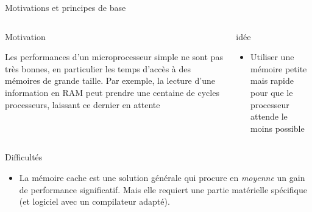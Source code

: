 
% 
\begin{Frame}{Motivations et principes de base}
  \begin{columns}[t]
    \begin{column}{\BW} %
      \begin{block}{Motivation}

 Les performances d'un microprocesseur simple ne sont pas
          très bonnes, en particulier les temps d'accès à des mémoires
          de grande taille. Par exemple, la lecture d'une information
          en RAM peut prendre une centaine de cycles processeurs,
          laissant ce dernier en attente

      \end{block} 
    \end{column}
    
    \begin{column}{5cm} %
      \begin{block}{idée}
\begin{itemize}
        \item Utiliser une mémoire petite mais rapide pour que le processeur attende le moins possible
        \end{itemize}
      \end{block}   
    \end{column}
  \end{columns}  

\begin{block}{Difficultés}
       \begin{center}
 	\begin{itemize}
         \item La mémoire cache est une solution générale qui procure en \emph{moyenne} un gain de performance significatif. Mais elle requiert une partie matérielle spécifique (et logiciel avec un compilateur adapté). 
        \end{itemize}
       \end{center}
      \end{block}   

\end{Frame}


